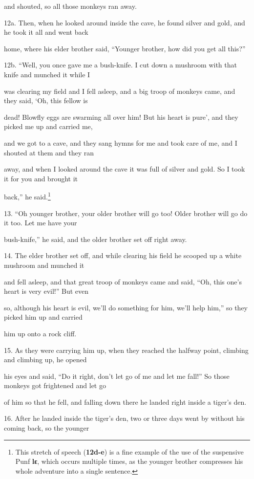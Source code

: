 and shouted, so all those monkeys ran away.

12a. Then, when he looked around inside the cave, he found silver and gold, and
he took it all and went back

home, where his elder brother said, ``Younger brother, how did you get all this?''


12b. ``Well, you once gave me a bush-knife. I cut down a mushroom with that knife
and munched it while I

was clearing my field and I fell asleep, and a big troop of monkeys came, and they
said, `Oh, this fellow is

dead! Blowfly eggs are swarming all over him! But his heart is pure', and they
picked me up and carried me,

and we got to a cave, and they sang hymns for me and took care of me, and I shouted
at them and they ran

away, and when I looked around the cave it was full of silver and gold. So I took
it for you and brought it

back,'' he said.\footnote{This stretch of speech (\textbf{12d-e}) is a fine example of the use of the suspensive Punf \textbf{lɛ}, which occurs multiple times, as the younger brother compresses his whole adventure into a single sentence.}

13. ``Oh younger brother, your older brother will go too! Older brother will go
do it too. Let me have your

bush-knife,'' he said, and the older brother set off right away.

14. The elder brother set off, and while clearing his field he scooped up a white
mushroom and munched it

and fell asleep, and that great troop of monkeys came and said, ``Oh, this one's
heart is very evil!'' But even

so, although his heart is evil, we'll do something for him, we'll help him,''
so they picked him up and carried

him up onto a rock cliff.

15. As they were carrying him up, when they reached the halfway point, climbing
and climbing up, he opened

his eyes and said, ``Do it right, don't let go of me and let me fall!'' So those
monkeys got frightened and let go

of him so that he fell, and falling down there he landed right inside a tiger's
den.

16. After he landed inside the tiger's den, two or three days went by without his
coming back, so the younger

